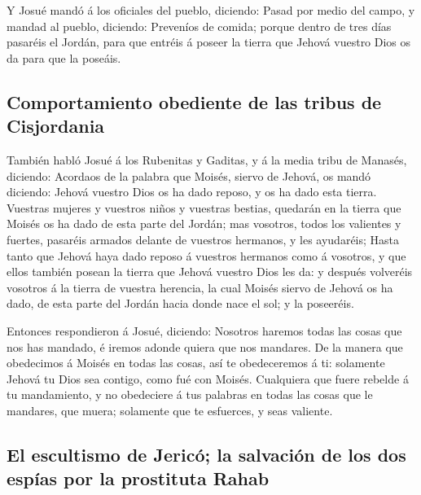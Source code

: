  Y Josué mandó á los oficiales del pueblo, diciendo:
 Pasad por medio del campo, y mandad al pueblo, diciendo:
Preveníos de comida; porque dentro de tres días pasaréis el Jordán, para
que entréis á poseer la tierra que Jehová vuestro Dios os da para que la
poseáis.

\hypertarget{comportamiento-obediente-de-las-tribus-de-cisjordania}{%
\subsection{Comportamiento obediente de las tribus de
Cisjordania}\label{comportamiento-obediente-de-las-tribus-de-cisjordania}}

 También habló Josué á los Rubenitas y Gaditas, y á la
media tribu de Manasés, diciendo:  Acordaos de la palabra
que Moisés, siervo de Jehová, os mandó diciendo: Jehová vuestro Dios os
ha dado reposo, y os ha dado esta tierra.  Vuestras
mujeres y vuestros niños y vuestras bestias, quedarán en la tierra que
Moisés os ha dado de esta parte del Jordán; mas vosotros, todos los
valientes y fuertes, pasaréis armados delante de vuestros hermanos, y
les ayudaréis;  Hasta tanto que Jehová haya dado reposo á
vuestros hermanos como á vosotros, y que ellos también posean la tierra
que Jehová vuestro Dios les da: y después volveréis vosotros á la tierra
de vuestra herencia, la cual Moisés siervo de Jehová os ha dado, de esta
parte del Jordán hacia donde nace el sol; y la poseeréis.

 Entonces respondieron á Josué, diciendo: Nosotros
haremos todas las cosas que nos has mandado, é iremos adonde quiera que
nos mandares.  De la manera que obedecimos á Moisés en
todas las cosas, así te obedeceremos á ti: solamente Jehová tu Dios sea
contigo, como fué con Moisés.  Cualquiera que fuere
rebelde á tu mandamiento, y no obedeciere á tus palabras en todas las
cosas que le mandares, que muera; solamente que te esfuerces, y seas
valiente.

\hypertarget{el-escultismo-de-jericuxf3-la-salvaciuxf3n-de-los-dos-espuxedas-por-la-prostituta-rahab}{%
\subsection{El escultismo de Jericó; la salvación de los dos espías por
la prostituta
Rahab}\label{el-escultismo-de-jericuxf3-la-salvaciuxf3n-de-los-dos-espuxedas-por-la-prostituta-rahab}}

